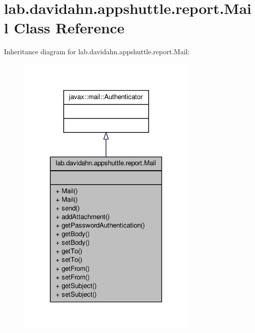 \hypertarget{classlab_1_1davidahn_1_1appshuttle_1_1report_1_1_mail}{\section{lab.\-davidahn.\-appshuttle.\-report.\-Mail \-Class \-Reference}
\label{classlab_1_1davidahn_1_1appshuttle_1_1report_1_1_mail}
}


\-Inheritance diagram for lab.\-davidahn.\-appshuttle.\-report.\-Mail\-:
\nopagebreak
\begin{figure}[H]
\begin{center}
\leavevmode
\includegraphics[width=248pt]{classlab_1_1davidahn_1_1appshuttle_1_1report_1_1_mail__inherit__graph}
\end{center}
\end{figure}


